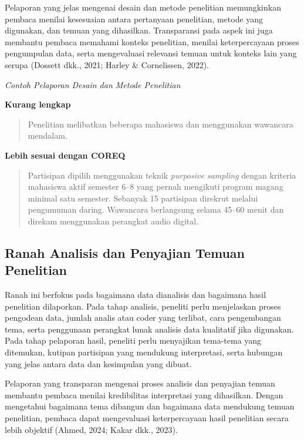 \documentclass[
  indonesian,
  letterpaper,
  DIV=11,
  numbers=noendperiod]{scrreprt}
\begin{document}
Pelaporan yang jelas mengenai desain dan metode penelitian memungkinkan
pembaca menilai kesesuaian antara pertanyaan penelitian, metode yang
digunakan, dan temuan yang dihasilkan. Transparansi pada aspek ini juga
membantu pembaca memahami konteks penelitian, menilai keterpercayaan
proses pengumpulan data, serta mengevaluasi relevansi temuan untuk
konteks lain yang serupa (Dossett dkk., 2021; Harley \& Cornelissen,
2022).

\emph{Contoh Pelaporan Desain dan Metode Penelitian}

\textbf{Kurang lengkap}

\begin{quote}
Penelitian melibatkan beberapa mahasiswa dan menggunakan wawancara
mendalam.
\end{quote}

\textbf{Lebih sesuai dengan COREQ}

\begin{quote}
Partisipan dipilih menggunakan teknik \emph{purposive sampling} dengan
kriteria mahasiswa aktif semester 6--8 yang pernah mengikuti program
magang minimal satu semester. Sebanyak 15 partisipan direkrut melalui
pengumuman daring. Wawancara berlangsung selama 45--60 menit dan direkam
menggunakan perangkat audio digital.
\end{quote}

\subsection{Ranah Analisis dan Penyajian Temuan
Penelitian}\label{ranah-analisis-dan-penyajian-temuan-penelitian}

Ranah ini berfokus pada bagaimana data dianalisis dan bagaimana hasil
penelitian dilaporkan. Pada tahap analisis, peneliti perlu menjelaskan
proses pengodean data, jumlah analis atau coder yang terlibat, cara
pengembangan tema, serta penggunaan perangkat lunak analisis data
kualitatif jika digunakan. Pada tahap pelaporan hasil, peneliti perlu
menyajikan tema-tema yang ditemukan, kutipan partisipan yang mendukung
interpretasi, serta hubungan yang jelas antara data dan kesimpulan yang
dibuat.

Pelaporan yang transparan mengenai proses analisis dan penyajian temuan
membantu pembaca menilai kredibilitas interpretasi yang dihasilkan.
Dengan mengetahui bagaimana tema dibangun dan bagaimana data mendukung
temuan penelitian, pembaca dapat mengevaluasi keterpercayaan hasil
penelitian secara lebih objektif (Ahmed, 2024; Kakar dkk., 2023).
\end{document}

